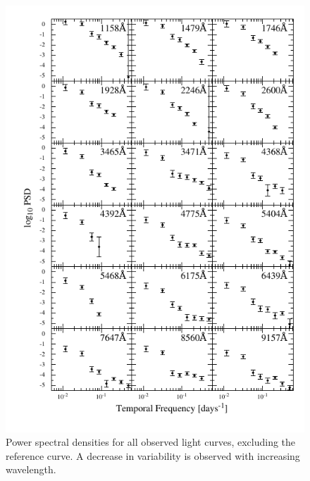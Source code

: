 \documentclass[11pt,letterpaper]{article}
\begin{document}
    \begin{figure}
        \centering
        \includegraphics[width=.9\textwidth]{../img/psd_atlas.pdf}
        \caption{Power spectral densities for all observed light curves, excluding the reference curve. A decrease in variability is observed with increasing wavelength.}
        \label{fig:psd_atlas}
    \end{figure}
\end{document}
